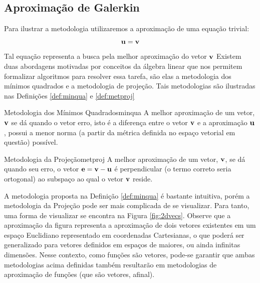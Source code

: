   \subsection{Aproximação de Galerkin}
  Para ilustrar a metodologia utilizaremos a aproximação de uma equação
  trivial: 
  \begin{equation}
  \bm{\mathrm{u}} = \bm{\mathrm{v}}
  \end{equation}
  Tal equação representa a busca pela melhor aproximação do vetor $\bm{\mathrm{v}}$ 
  Existem duas abordagens motivadas por conceitos da álgebra
  linear que nos permitem formalizar algoritmos para resolver essa tarefa, são
  elas a metodologia dos mínimos quadrados e a metodologia de projeção. Tais
  metodologias são ilustradas nas Definições \ref{def:minqua} e \ref{def:metproj} 

  \begin{Definition}{Metodologia dos Mínimos Quadrados}{minqua}
  A melhor aproximação de um vetor, $\bm{\mathrm{v}}$ se dá quando o vetor erro, isto é a
  diferença entre o vetor $\bm{\mathrm{v}}$ e a aproximação $\bm{\mathrm{u}}$, possui a menor norma
  (a partir da métrica definida no espaço vetorial em questão) possível.
  \end{Definition}

  \begin{Definition}{Metodologia da Projeção}{metproj}
  A melhor aproximação de um vetor, $\bm{\mathrm{v}}$, se dá quando seu erro, o vetor $\bm{\mathrm{e}} =
  \bm{\mathrm{v}} - \bm{\mathrm{u}}$ é perpendicular (o termo correto seria ortogonal) ao
  subspaço ao qual o vetor $\bm{\mathrm{v}}$ reside.
  \end{Definition}
  A metodologia proposta na Definição \ref{def:minqua} é bastante intuitiva,
  porém a metodologia da Projeção pode ser mais complicada de se visualizar.
  Para tanto, uma forma de visualizar se encontra na Figura \ref{fig:2dvecs}.
  Observe que a aproximação da figura representa a aproximação de dois vetores
  existentes em um espaço Euclidiano representado em coordenadas Cartesianas, o
  que poderá ser generalizado para vetores definidos em espaços de maiores, ou
  ainda infinitas dimensões. Nesse contexto, como funções são vetores, pode-se
  garantir que ambas metodologias acima definidas também resultarão em
  metodologias de aproximação de funções (que são vetores, afinal).


